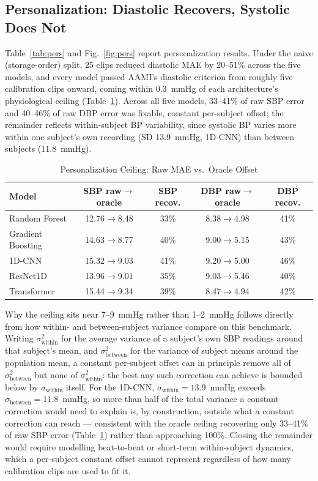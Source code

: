 \documentclass[journal]{IEEEtran}
\begin{document}
\subsection{Personalization: Diastolic Recovers, Systolic Does Not}
Table~\ref{tab:pers} and Fig.~\ref{fig:pers} report personalization results. Under the naive (storage-order) split, 25 clips reduced diastolic MAE by 20--51\% across the five models, and every model passed AAMI's diastolic criterion from roughly five calibration clips onward, coming within 0.3~mmHg of each architecture's physiological ceiling (Table~\ref{tab:ceiling}). Across all five models, 33--41\% of raw SBP error and 40--46\% of raw DBP error was fixable, constant per-subject offset; the remainder reflects within-subject BP variability, since systolic BP varies more within one subject's own recording (SD 13.9~mmHg, 1D-CNN) than between subjects (11.8~mmHg).

\begin{table}[!t]
\caption{Personalization Ceiling: Raw MAE vs.\ Oracle Offset}
\label{tab:ceiling}
\centering
\begin{tabular}{lcccc}
\toprule
Model & SBP raw$\to$oracle & SBP recov. & DBP raw$\to$oracle & DBP recov. \\
\midrule
Random Forest & 12.76$\to$8.48 & 33\% & 8.38$\to$4.98 & 41\% \\
Gradient Boosting & 14.63$\to$8.77 & 40\% & 9.00$\to$5.15 & 43\% \\
1D-CNN & 15.32$\to$9.03 & 41\% & 9.20$\to$5.00 & 46\% \\
ResNet1D & 13.96$\to$9.01 & 35\% & 9.03$\to$5.46 & 40\% \\
Transformer & 15.44$\to$9.34 & 39\% & 8.47$\to$4.94 & 42\% \\
\bottomrule
\end{tabular}
\end{table}

Why the ceiling sits near 7--9~mmHg rather than 1--2~mmHg follows directly from how within- and between-subject variance compare on this benchmark. Writing $\sigma^2_{\mathrm{within}}$ for the average variance of a subject's own SBP readings around that subject's mean, and $\sigma^2_{\mathrm{between}}$ for the variance of subject means around the population mean, a constant per-subject offset can in principle remove all of $\sigma^2_{\mathrm{between}}$ but none of $\sigma^2_{\mathrm{within}}$: the best any such correction can achieve is bounded below by $\sigma_{\mathrm{within}}$ itself. For the 1D-CNN, $\sigma_{\mathrm{within}} = 13.9$~mmHg exceeds $\sigma_{\mathrm{between}} = 11.8$~mmHg, so more than half of the total variance a constant correction would need to explain is, by construction, outside what a constant correction can reach --- consistent with the oracle ceiling recovering only 33--41\% of raw SBP error (Table~\ref{tab:ceiling}) rather than approaching 100\%. Closing the remainder would require modelling beat-to-beat or short-term within-subject dynamics, which a per-subject constant offset cannot represent regardless of how many calibration clips are used to fit it.
\end{document}
